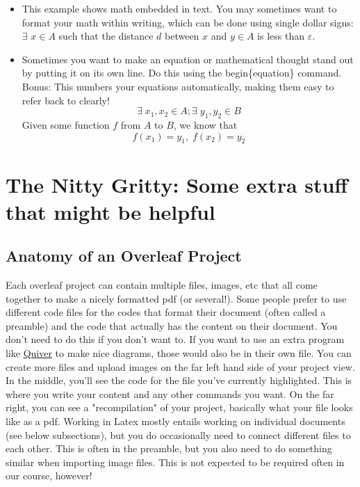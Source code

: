 \documentclass[11 pt]{article}
\begin{document}
\begin{itemize}
    \item This example shows math embedded in text. You may sometimes want to format your math within writing, which can be done using single dollar signs: $\exists$  $x\in A$ such that the distance $d$ between $x$ and $y \in A$ is less than $\varepsilon$.
    \item Sometimes you want to make an equation or mathematical thought stand out by putting it on its own line. Do this using the begin\{equation\} command. Bonus: This numbers your equations automatically, making them easy to refer back to clearly!
    \begin{equation}
        \exists \; x_1, x_2 \in A; \exists \; y_1, y_2 \in B 
    \end{equation}
    Given some function $f$ from $A$ to $B$, we know that
    \begin{equation}
        f(x_1) = y_1, \; f(x_2) = y_2
    \end{equation}
\end{itemize}
\pagebreak %
\section{The Nitty Gritty: Some extra stuff that might be helpful}
\subsection{Anatomy of an Overleaf Project}
Each overleaf project can contain multiple files, images, etc that all come together to make a nicely formatted pdf (or several!). Some people prefer to use different code files for the codes that format their document (often called a preamble) and the code that actually has the content on their document. You don't need to do this if you don't want to. If you want to use an extra program like \href{https://q.uiver.app/}{Quiver} to make nice diagrams, those would also be in their own file. You can create more files and upload images on the far left hand side of your project view. In the middle, you'll see the code for the file you've currently highlighted. This is where you write your content and any other commands you want. On the far right, you can see a "recompilation" of your project, basically what your file looks like as a pdf. Working in Latex mostly entails working on individual documents (see below subsections), but you do occasionally need to connect different files to each other. This is often in the preamble, but you also need to do something similar when importing image files. This is not expected to be required often in our course, however!
\end{document}
